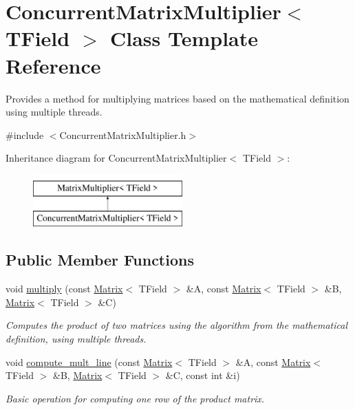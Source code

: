 \hypertarget{classConcurrentMatrixMultiplier}{}\section{Concurrent\+Matrix\+Multiplier$<$ T\+Field $>$ Class Template Reference}
\label{classConcurrentMatrixMultiplier}


Provides a method for multiplying matrices based on the mathematical definition using multiple threads.  




{\ttfamily \#include $<$Concurrent\+Matrix\+Multiplier.\+h$>$}

Inheritance diagram for Concurrent\+Matrix\+Multiplier$<$ T\+Field $>$\+:\begin{figure}[H]
\begin{center}
\leavevmode
\includegraphics[height=2.000000cm]{classConcurrentMatrixMultiplier}
\end{center}
\end{figure}
\subsection*{Public Member Functions}
\begin{DoxyCompactItemize}
\item 
void \mbox{\hyperlink{classConcurrentMatrixMultiplier_af4c7cedd919db3c918e48521df54b52e}{multiply}} (const \mbox{\hyperlink{classMatrix}{Matrix}}$<$ T\+Field $>$ \&A, const \mbox{\hyperlink{classMatrix}{Matrix}}$<$ T\+Field $>$ \&B, \mbox{\hyperlink{classMatrix}{Matrix}}$<$ T\+Field $>$ \&C)
\begin{DoxyCompactList}\small\item\em Computes the product of two matrices using the algorithm from the mathematical definition, using multiple threads. \end{DoxyCompactList}\item 
void \mbox{\hyperlink{classConcurrentMatrixMultiplier_ad712a4f89999ea327367f88502bc90d7}{compute\+\_\+mult\+\_\+line}} (const \mbox{\hyperlink{classMatrix}{Matrix}}$<$ T\+Field $>$ \&A, const \mbox{\hyperlink{classMatrix}{Matrix}}$<$ T\+Field $>$ \&B, \mbox{\hyperlink{classMatrix}{Matrix}}$<$ T\+Field $>$ \&C, const int \&i)
\begin{DoxyCompactList}\small\item\em Basic operation for computing one row of the product matrix. \end{DoxyCompactList}\end{DoxyCompactItemize}



